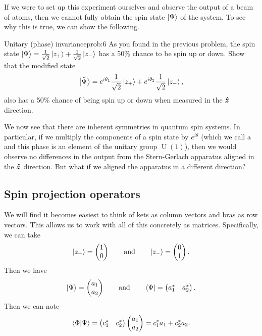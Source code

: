 \documentclass{article}
\begin{document}
If we were to set up this experiment ourselves and observe the output of a beam of atoms, then we cannot fully obtain the spin state $\ket{\Psi}$ of the system. To see why this is true, we can show the following.

\begin{problem}{Unitary (phase) invariance}{prob:6}
    As you found in the previous problem, the spin state $\ket{\Psi} = \frac{1}{\sqrt{2}} \ket{z_+} + \frac{1}{\sqrt{2}} \ket{z_-}$ has a 50\% chance to be spin up or down. Show that the modified state
    \[
    \ket{\tilde{\Psi}} = e^{i \theta_1} \frac{1}{\sqrt{2}} \ket{z_+} + e^{i \theta_2} \frac{1}{\sqrt{2}} \ket{z_-},
    \]
    also has a 50\% chance of being spin up or down when measured in the $\boldsymbol{\hat{z}}$ direction.
\end{problem}

We now see that there are inherent symmetries in quantum spin systems. In particular, if we multiply the components of a spin state by $e^{i \theta}$ (which we call a  and this phase is an element of the unitary group $\operatorname{U}(1)$), then we would observe no differences in the output from the Stern-Gerlach apparatus aligned in the $\boldsymbol{\hat{z}}$ direction. But what if we aligned the apparatus in a different direction?

\subsection{Spin projection operators}

We will find it becomes easiest to think of kets as column vectors and bras as row vectors. This allows us to work with all of this concretely as matrices. Specifically, we can take
\[
\ket{z_+} = \begin{pmatrix} 1 \\ 0 \end{pmatrix} \qquad \textrm{and} \qquad \ket{z_-}=\begin{pmatrix} 0 \\ 1 \end{pmatrix}.
\]
Then we have
\[
\ket{\Psi} = \begin{pmatrix} a_1 \\ a_2 \end{pmatrix} \qquad \textrm{and} \qquad \bra{\Psi} = \begin{pmatrix} a_1^* & a_2^* \end{pmatrix}.
\]
Then we can note
\[
\bra{\Phi}\ket{\Psi} = \begin{pmatrix} c_1^* & c_2^* \end{pmatrix} \begin{pmatrix} a_1 \\ a_2 \end{pmatrix} = c_1^*a_1 + c_2^* a_2.
\]
\end{document}
